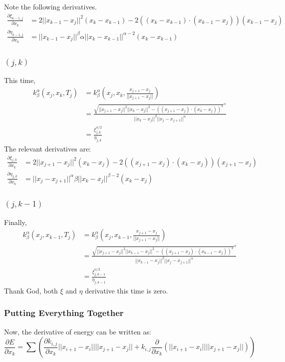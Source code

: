 \documentclass[a4paper, 11pt]{article}
\newcommand{\norm}[1]{||#1||}
\theoremstyle{definition}
\theoremstyle{remark}
\begin{document}
Note the following derivatives.
\begin{align}
    \frac{\partial \xi_{k-1,j}}{\partial x_k} &= 2 \norm{x_{k-1} - x_j}^2 (x_k - x_{k-1}) - 2 \left( \left( x_k - x_{k-1} \right) \cdot \left( x_{k-1} - x_j \right) \right) (x_{k-1} -x_j) \\
    \frac{\partial \eta_{k-1,j}}{\partial x_k} &= \norm{x_{k-1} - x_j}^{\beta} \alpha \norm{x_{k} - x_{k-1}}^{\alpha - 2} (x_{k} - x_{k-1})
\end{align}

\subsubsection{$(j, k)$}
This time,
\begin{align}
    k_{\beta}^{\alpha} \left( x_j, x_k, T_j \right) &= k_{\beta}^{\alpha} \left( x_j, x_k, \frac{x_{j+1} - x_j}{\norm{x_{j+1} - x_j}}\right) \\
    &= \frac{\sqrt{\norm{x_{j+1} - x_{j}}^2 \norm{x_{k} - x_j}^2- \left( \left( x_{j+1} - x_{j} \right) \cdot \left( x_{k} - x_{j} \right) \right)^2}^{\alpha} }{\norm{x_{k} - x_j}^{\beta} \norm{x_j - x_{j+1}}^{\alpha}} \\
    &= \frac{\xi_{j,k}^{\alpha / 2}}{\eta_{j,k}}
\end{align}
The relevant derivatives are:
\begin{align}
    \frac{\partial \xi_{j,k}}{\partial x_k} &= 2 \norm{x_{j+1} - x_j}^2 (x_k - x_j) - 2 \left( \left( x_{j+1} - x_{j} \right) \cdot \left( x_{k} - x_{j} \right) \right) \left( x_{j+1} - x_j \right) \\
    \frac{\partial \eta_{j,k}}{\partial x_k} &= \norm{x_j - x_{j+1}}^{\alpha} \beta \norm{x_k - x_j}^{\beta - 2} \left( x_k - x_j \right)
\end{align}
\subsubsection{$(j, k-1)$}
Finally,
\begin{align}
    k_{\beta}^{\alpha} \left( x_j, x_{k-1}, T_j \right) &= k_{\beta}^{\alpha} \left( x_j, x_{k-1}, \frac{x_{j+1} - x_j}{\norm{x_{j+1} - x_j}}\right) \\
    &= \frac{\sqrt{\norm{x_{j+1} - x_{j}}^2 \norm{x_{k-1} - x_j}^2- \left( \left( x_{j+1} - x_{j} \right) \cdot \left( x_{k-1} - x_{j} \right) \right)^2}^{\alpha} }{\norm{x_{k-1} - x_j}^{\beta} \norm{x_j - x_{j+1}}^{\alpha}} \\
    &= \frac{\xi_{j,k-1}^{\alpha / 2}}{\eta_{j,k-1}}
\end{align}
Thank God, both $\xi$ and $\eta$ derivative this time is zero.

\subsubsection{Putting Everything Together}
Now, the derivative of energy can be written as:
\begin{equation}
    \frac{\partial E}{\partial x_k} = \sum \left( \frac{\partial k_{i,j}}{\partial x_k} \norm{x_{i+1} - x_i} \norm{x_{j+1} - x_j} + k_{i,j} \frac{\partial}{\partial x_k} \left( \norm{x_{i+1} - x_{i}} \norm{x_{j+1} - x_j} \right) \right)
\end{equation}
\end{document}
